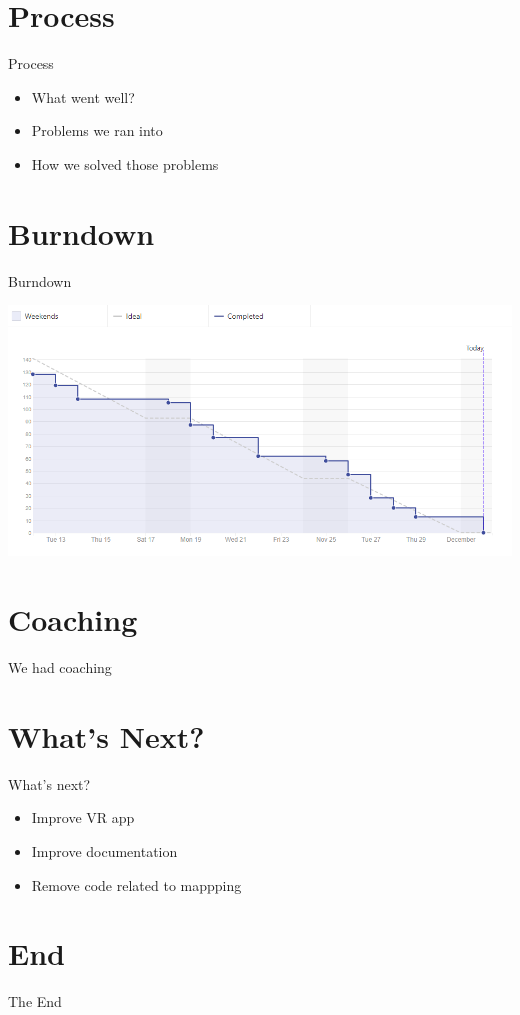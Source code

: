 \documentclass{beamer}
\begin{document}
\section{Process}
\begin{frame}{Process}
    \begin{itemize}
        \item What went well?
        \item Problems we ran into
        \item How we solved those problems
    \end{itemize}
\end{frame}

\section{Burndown}
\begin{frame}{Burndown}
    \begin{center}
      \includegraphics[scale=1.25]{images/burndown.png}
    \end{center}
\end{frame}

\section{Coaching}
\begin{frame}
\Huge{\centerline{We had coaching}}
\end{frame}

\section{What's Next? }
\begin{frame}{What's next?}
    \begin{itemize}
        \item Improve VR app
        \item Improve documentation
        \item Remove code related to mappping
    \end{itemize}
\end{frame}

\section{End}
\begin{frame}
\Huge{\centerline{The End}}
\end{frame}
\end{document}
